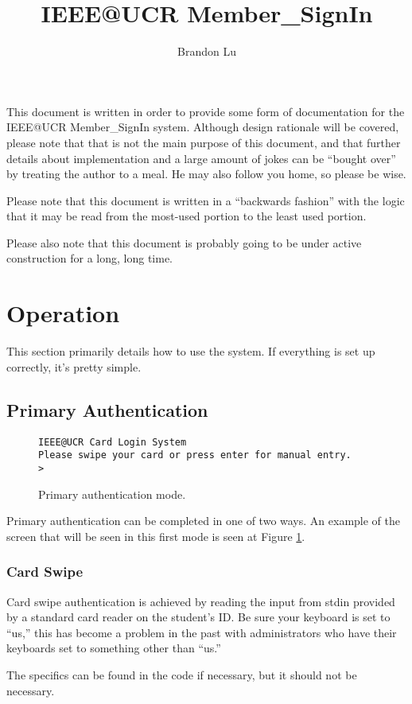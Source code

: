 \documentclass[12pt]{article}
\begin{document}
\title{IEEE@UCR Member\_SignIn}
\author{Brandon Lu}
\maketitle

This document is written in order to provide some form of documentation for
the IEEE@UCR Member\_SignIn system.  Although design rationale will be
covered, please note that that is not the main purpose of this document,
and that further details about implementation and a large amount of jokes
can be ``bought over'' by treating the author to a meal.  He may also follow
you home, so please be wise.

Please note that this document is written in a ``backwards fashion'' with the 
logic that it may be read from the most-used portion to the least used
portion.

Please also note that this document is probably going to be under active
construction for a long, long time.
\newpage

\section{Operation}
This section primarily details how to use the system.  If everything is set up
correctly, it's pretty simple.
	\subsection{Primary Authentication}
\begin{figure}[h]
{\tt IEEE@UCR Card Login System\\
Please swipe your card or press enter for manual entry.\\
> }
\caption{Primary authentication mode.}
\label{fig:pauth}
\end{figure}
Primary authentication can be completed in one of two ways.  An example of
the screen that will be seen in this first mode is seen at Figure
\ref{fig:pauth}.
		\subsubsection{Card Swipe}
Card swipe authentication is achieved by reading the input from stdin provided
by a standard card reader on the student's ID.  Be sure your keyboard is set
to ``us,'' this has become a problem in the past with administrators who have
their keyboards set to something other than ``us.''

The specifics can be found in the code if necessary, but it should not be
necessary.
\end{document}
